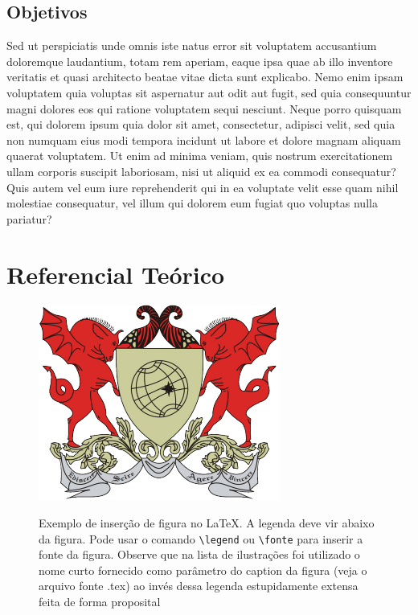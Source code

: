 \documentclass[
12pt,				    %
openright,			    %
oneside,			    %
a4paper,			    %
sumario=tradicional,    %
english,			    %
brazil,				    %
]{abntex2}              %
\begin{document}
	\section{Objetivos}
	Sed ut perspiciatis unde omnis iste natus error sit voluptatem accusantium doloremque laudantium, totam rem aperiam, eaque ipsa quae ab illo inventore veritatis et quasi architecto beatae vitae dicta sunt explicabo. Nemo enim ipsam voluptatem quia voluptas sit aspernatur aut odit aut fugit, sed quia consequuntur magni dolores eos qui ratione voluptatem sequi nesciunt. Neque porro quisquam est, qui dolorem ipsum quia dolor sit amet, consectetur, adipisci velit, sed quia non numquam eius modi tempora incidunt ut labore et dolore magnam aliquam quaerat voluptatem. Ut enim ad minima veniam, quis nostrum exercitationem ullam corporis suscipit laboriosam, nisi ut aliquid ex ea commodi consequatur? Quis autem vel eum iure reprehenderit qui in ea voluptate velit esse quam nihil molestiae consequatur, vel illum qui dolorem eum fugiat quo voluptas nulla pariatur?
	
	\chapter{Referencial Teórico}\label{sec:refTeorico}
	\begin{figure}[htbp]
		\begin{center}
			\includegraphics[width=.5\linewidth]{LogoUFV.png}\\
		\end{center}
		\caption[Exemplo de Figura]{Exemplo de inserção de figura no \LaTeX. A legenda deve vir abaixo da figura. Pode usar o comando \texttt{\textbackslash legend} ou \texttt{\textbackslash fonte} para inserir a fonte da figura. Observe que na lista de ilustrações foi utilizado o nome curto fornecido como parâmetro do caption da figura (veja o arquivo fonte .tex) ao invés dessa legenda estupidamente extensa feita de forma proposital}
		\label{fig:logo}
	\end{figure}
	
\end{document}
